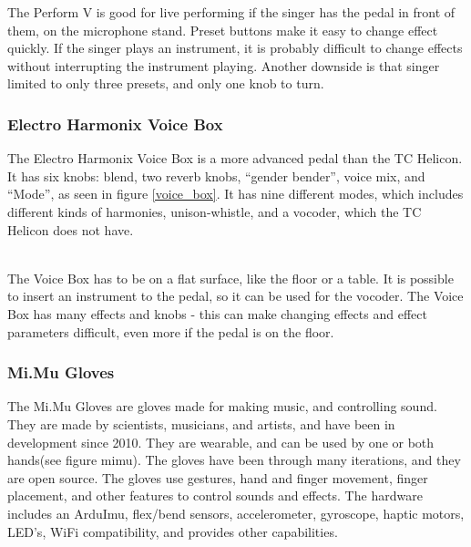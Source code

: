 The Perform V is good for live performing if the singer has the pedal in front of them, on the microphone stand. Preset buttons make it easy to change effect quickly. 
If the singer plays an instrument, it is probably difficult to change effects without interrupting the instrument playing. Another downside is that singer limited to only three presets, and only one knob to turn.

\subsubsection{Electro Harmonix Voice Box}

The Electro Harmonix Voice Box is a more advanced pedal than the TC Helicon\citep{VoiceBox}. It has six knobs: blend, two reverb knobs, “gender bender”, voice mix, and “Mode”, as seen in figure \ref{voice_box}. It has nine different modes, which includes different kinds of harmonies, unison-whistle, and a vocoder, which the TC Helicon does not have.\\

\begin{minipage}{\linewidth}%
\label{voice_box}
\end{minipage}\\

The Voice Box has to be on a flat surface, like the floor or a table. It is possible to insert an instrument to the pedal, so it can be used for the vocoder. The Voice Box has many effects and knobs - this can make changing effects and effect parameters difficult, even more if the pedal is on the floor.

\subsubsection{Mi.Mu Gloves}

The Mi.Mu Gloves are gloves made for making music, and controlling sound\citep{Mimu}. They are made by scientists, musicians, and artists, and have been in development since 2010. They are wearable, and can be used by one or both hands(see figure mimu). The gloves have been through many iterations, and they are open source. The gloves use gestures, hand and finger movement, finger placement, and other features to control sounds and effects. The hardware includes an ArduImu, flex/bend sensors, accelerometer, gyroscope, haptic motors, LED's, WiFi compatibility, and provides other capabilities.\\

